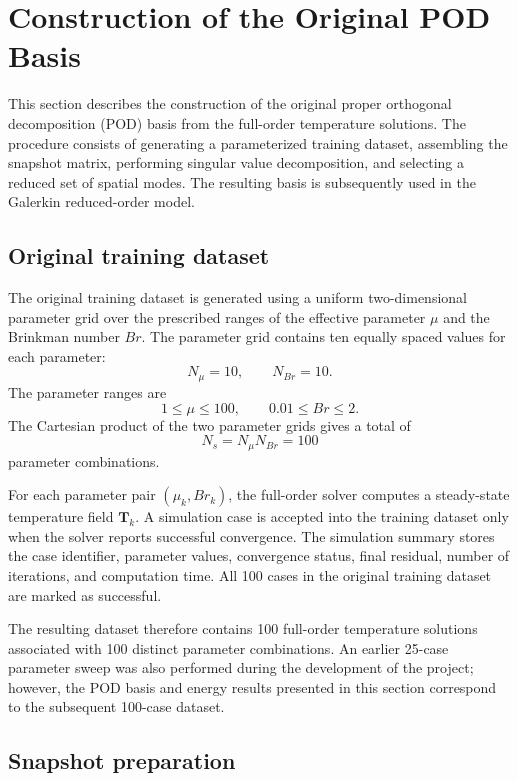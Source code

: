 \section{Construction of the Original POD Basis}
\label{sec:original_pod_basis}

This section describes the construction of the original proper
orthogonal decomposition (POD) basis from the full-order temperature
solutions. The procedure consists of generating a parameterized
training dataset, assembling the snapshot matrix, performing singular
value decomposition, and selecting a reduced set of spatial modes.
The resulting basis is subsequently used in the Galerkin
reduced-order model.

\subsection{Original training dataset}

The original training dataset is generated using a uniform
two-dimensional parameter grid over the prescribed ranges of the
effective parameter $\mu$ and the Brinkman number $Br$. The
parameter grid contains ten equally spaced values for each
parameter:
\[
N_{\mu}=10,\qquad N_{Br}=10.
\]
The parameter ranges are
\[
1\leq\mu\leq100,\qquad
0.01\leq Br\leq2.
\]
The Cartesian product of the two parameter grids gives a total of
\[
\boxed{N_s=N_{\mu}N_{Br}=100}
\]
parameter combinations.

For each parameter pair $(\mu_k,Br_k)$, the full-order solver
computes a steady-state temperature field $\mathbf{T}_k$. A
simulation case is accepted into the training dataset only when
the solver reports successful convergence. The simulation summary
stores the case identifier, parameter values, convergence status,
final residual, number of iterations, and computation time.
All 100 cases in the original training dataset are marked as
successful.

The resulting dataset therefore contains 100 full-order
temperature solutions associated with 100 distinct parameter
combinations. An earlier 25-case parameter sweep was also
performed during the development of the project; however, the
POD basis and energy results presented in this section correspond
to the subsequent 100-case dataset.

\subsection{Snapshot preparation}

